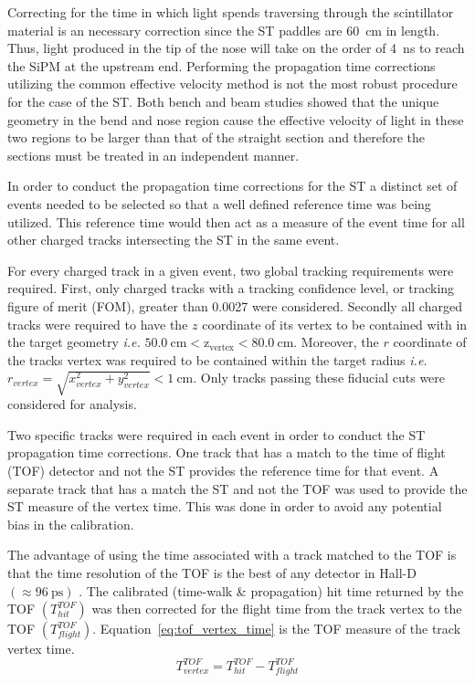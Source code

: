Correcting for the time in which light spends traversing through the scintillator material is an necessary correction since the ST paddles are 60~cm in length.  Thus, light produced in the tip of the nose will take on the order of 4~ns to reach the SiPM at the upstream end.  Performing the propagation time corrections utilizing the common effective velocity method is not the most robust procedure for the case of the ST.  Both bench and beam studies showed that the unique geometry in the bend and nose region cause the effective velocity of light in these two regions to be larger than that of the straight section and therefore the sections must be treated in an independent manner.

In order to conduct the propagation time corrections for the ST a distinct set of events needed to be selected so that a well defined reference time was being utilized.  This reference time would then act as a measure of the event time for all other charged tracks intersecting the ST in the same event.  

For every charged track in a given event, two global tracking requirements were required.  First, only charged tracks with a tracking confidence level, or tracking figure of merit (FOM), greater than 0.0027 were considered.  Secondly all charged tracks were required to have the $z$ coordinate of its vertex to be contained with in the target geometry \textit{i.e.} $\mathrm{50.0\ cm < z_{vertex} < 80.0\ cm}$.  Moreover, the $r$ coordinate of the tracks vertex was required to be contained within the target radius \textit{i.e.} $r_{vertex} = \sqrt{x^{2}_{vertex} + y^{2}_{vertex}} < 1\ \mathrm{cm}$.  Only tracks passing these fiducial cuts were considered for analysis.

Two specific tracks were required in each event in order to conduct the ST propagation time corrections.  One track that has a match to the time of flight (TOF) detector and not the ST provides the reference time for that event.  A separate track that has a match the ST and not the TOF was used to provide the ST measure of the vertex time.  This was done in order to avoid any potential bias in the calibration.  
	
The advantage of using the time associated with a track matched to the TOF is that the time resolution of the TOF is the best of any detector in Hall-D $(\approx 96\ \mathrm{ps})$ \cite{zihlmann_tof}. The calibrated (time-walk \& propagation) hit time returned by the TOF $(T^{TOF}_{hit})$ was then corrected for the flight time from the track vertex to the TOF $(T^{TOF}_{flight})$.  Equation~\ref{eq:tof_vertex_time} is the TOF measure of the track vertex time.
	\begin{equation} \label{eq:tof_vertex_time}
		T^{TOF}_{vertex} = T^{TOF}_{hit} - T^{TOF}_{flight}
	\end{equation}

